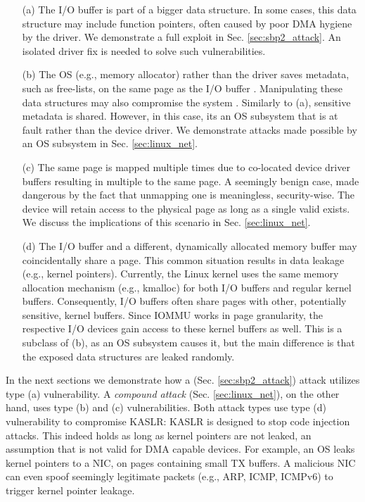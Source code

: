 \begin{enumerate}
    \item[(a)] The I/O buffer is part of a bigger data structure. In some cases, this data structure may include function pointers, often caused by poor DMA hygiene by the driver. We demonstrate a full exploit in Sec. \ref{sec:sbp2_attack}. An isolated driver fix is needed to solve such vulnerabilities.
    \item[(b)] The OS (e.g., memory allocator) rather than the driver saves metadata, such as free-lists, on the same page as the I/O buffer \cite{Cor07}. Manipulating these data structures may also compromise the system \cite{ak09}. Similarly to (a), sensitive metadata is shared. However, in this case, its an OS subsystem that is at fault rather than the device driver. We demonstrate attacks made possible by an OS subsystem in Sec. \ref{sec:linux_net}.
    \item[(c)] The same page is mapped multiple times due to co-located device driver buffers resulting in multiple \iova{} to the same page. A seemingly benign case, made dangerous by the fact that unmapping one \iova{} is meaningless, security-wise. The device will retain access to the physical page as long as a single valid \iova{} exists. We discuss the implications of this scenario in Sec. \ref{sec:linux_net}.
    \item[(d)] The I/O buffer and a different, dynamically allocated memory buffer may coincidentally share a page. This common situation results in data leakage (e.g., kernel pointers). Currently, the Linux kernel uses the same memory allocation mechanism (e.g., kmalloc) for both I/O buffers and regular kernel buffers. Consequently, I/O buffers often share pages with other, potentially sensitive, kernel buffers. Since IOMMU works in page granularity, the respective I/O devices gain access to these kernel buffers as well. This is a subclass of (b), as an OS subsystem causes it, but the main difference is that the exposed data structures are leaked randomly.

\end{enumerate}

In the next sections we demonstrate how a \simple{} (Sec. \ref{sec:sbp2_attack}) attack utilizes type (a) vulnerability. A \emph{compound attack} (Sec. \ref{sec:linux_net}), on the other hand, uses type (b) and (c) vulnerabilities. Both attack types use type (d) vulnerability to compromise KASLR: KASLR is designed to stop code injection attacks. This indeed holds as long as kernel pointers are not leaked, an assumption that is not valid for DMA capable devices. For example, an OS leaks kernel pointers to a NIC, on pages containing small TX buffers. A malicious NIC can even spoof seemingly legitimate packets (e.g., ARP, ICMP, ICMPv6) to trigger kernel pointer leakage.

